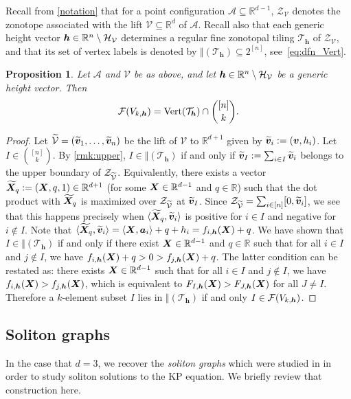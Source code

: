\documentclass[11pt]{amsart}
\theoremstyle{plain}
\newtheorem{proposition}[theorem]{Proposition}
\theoremstyle{definition}
\def\R{\mathbb{R}}
\def\v{{\bm{v}}}
\def\A{\mathcal{A}}
\def\V{\mathcal{V}}
\def\h{{\bm{h}}}
\def\a{{\bm{a}}}
\def\Zon{\mathcal{Z}}
\def\ZV{\Zon_\V}
\def\VC{\V}
\def\Mcal{\mathcal{M}}
\def\Tcal{\mathcal{T}}
\def\Tiling{\Tcal}
\let\subset\subseteq
\begin{document}
Recall from \cref{notation} that for a point configuration $\A\subset \R^{d-1}$, $\ZV$ denotes the zonotope associated with the lift $\VC\subset\R^d$ of $\A$. Recall also that each generic height vector $\h\in\GHV$ determines a regular fine zonotopal tiling $\Tiling_\h$ of $\ZV$, and that its set of vertex labels is denoted by $\Vert(\Tiling_\h)\subset 2^{[n]}$, see~\eqref{eq:dfn_Vert}.



\begin{proposition}\label{prop:soliton} 
Let $\A$ and $\VC$ be as above, and let $\h\in\GHV$ be a generic height vector. Then 
\[\FLKH=\Vert(\Tiling_\h)\cap {[n]\choose k}.\]
\end{proposition}
\begin{proof}
Let $\Vt=(\vt_1,\dots,\vt_n)$ be the lift of $\V$ to $\R^{d+1}$ given by $\vt_i:=(\v,h_i)$. Let $I\in{[n]\choose k}$. By \cref{rmk:upper}, $I\in\Vert(\Tiling_\h)$ if and only if $\vt_I:=\sum_{i\in I} \vt_i$ belongs to the upper boundary of 
	$\ZVt$. Equivalently, there exists a vector $\Xtq:=(\X,q,1)\in\R^{d+1}$ (for some $\X\in\R^{d-1}$ and $q\in\R$) such that the dot product with ${\widetilde{\bm{X}}}_q$ is maximized over $\ZVt$ at $\vt_I$. Since $\ZVt=\sum_{i\in[n]} [0,\vt_i]$, we see that this happens precisely when $\<\Xtq,\vt_i\>$ is positive for $i\in I$ and negative for $i\notin I$. Note that $\<\Xtq,\vt_i\>=\<\X,\a_i\>+q+h_i=f_{i,\h}(\X)+q$. We have shown that 
	$I\in\Vert(\Tiling_\h)$ 
	if and only if there exist $\X\in\R^{d-1}$ and $q\in\R$ such that for all $i\in I$ and $j\notin I$, we have $f_{i,\h}(\X)+q>0> f_{j,\h}(\X)+q$. The latter condition can be restated as: 
	there exists $\X\in\R^{d-1}$ such that 
	for all $i\in I$ and $j\notin I$, we have
	$f_{i,\h}(\X)> f_{j,\h}(\X)$, which is equivalent to  
		$F_{I,\h}(\X) > F_{J,\h}(\X)$ for all $J \neq I$.  
	Therefore a $k$-element subset $I$ lies in $\Vert(\Tiling_\h)$ 
if and only 
	$I\in\FLKH$. 
\end{proof}





\def\FA{F_A}
\def\FM{F_{\Mcal}} 

\subsection{Soliton graphs}\label{sec:soliton}

In the case that $d=3$, we recover the \emph{soliton graphs} which were
studied in \cite{KW, KW2} in order to study soliton solutions to the KP equation.
We briefly review that construction here.
\end{document}

